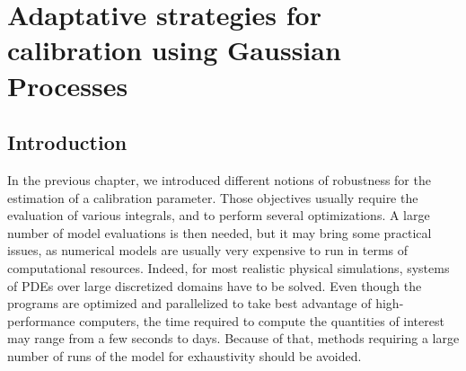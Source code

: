 \documentclass[../../Main_ManuscritThese.tex]{subfiles}
\begin{document}
\chapter{Adaptative strategies for calibration using Gaussian Processes}
\label{chap:adaptative_design_gp}
\minitoc
\newpage
\subfileLocal{\pagestyle{contentStyle}}



\section{Introduction}

In the previous chapter, we introduced different notions of robustness
for the estimation of a calibration parameter. Those objectives
usually require the evaluation of various integrals, and to perform
several optimizations. A large number of model evaluations is then
needed, but it may bring some practical issues, as numerical models
are usually very expensive to run in terms of computational
resources. Indeed, for most realistic physical simulations, systems of
PDEs over large discretized domains have to be solved. Even though the
programs are optimized and parallelized to take best advantage of
high-performance computers, the time required to compute the
quantities of interest may range from a few seconds to days. Because
of that, methods requiring a large number of runs of the model for
exhaustivity should be avoided.


\end{document}
